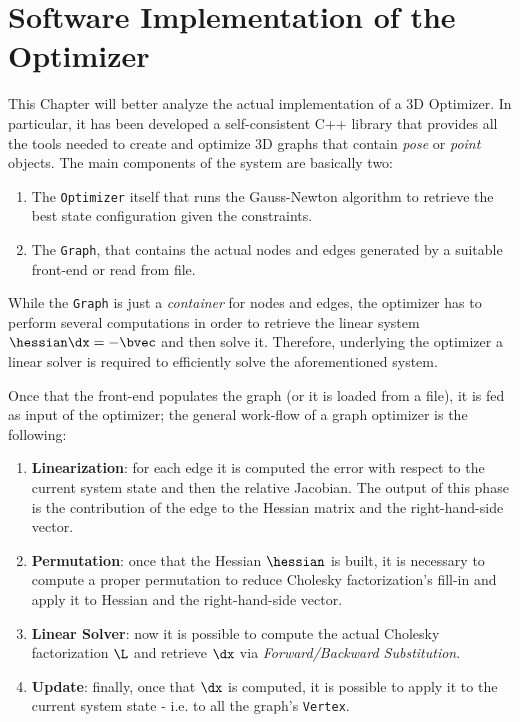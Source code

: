 \chapter{Software Implementation of the Optimizer}\label{ch:implementation}
This Chapter will better analyze the actual implementation of a 3D Optimizer. In particular, it has been developed a self-consistent C++ library that provides all the tools needed to create and optimize 3D graphs that contain \textit{pose} or \textit{point} objects. The main components of the system are basically two:

\begin{enumerate}
    \item The \texttt{Optimizer} itself that runs the Gauss-Newton algorithm to retrieve the best state configuration given the constraints.
    \item The \texttt{Graph}, that contains the actual nodes and edges generated by a suitable front-end or read from file.
\end{enumerate}

While the \texttt{Graph} is just a \textit{container} for nodes and edges, the optimizer has to perform several computations in order to retrieve the linear system $\hessian \dx = -\bvec$ and then solve it. Therefore, underlying the optimizer a linear solver is required to efficiently solve the aforementioned system. 

Once that the front-end populates the graph (or it is loaded from a file), it is fed as input of the optimizer; the general work-flow of a graph optimizer is the following:

\begin{enumerate}
    \item \textbf{Linearization}: for each edge it is computed the error with respect to the current system state and then the relative Jacobian. The output of this phase is the contribution of the edge to the Hessian matrix and the right-hand-side vector.
    \item \textbf{Permutation}: once that the Hessian $\hessian$ is built, it is necessary to compute a proper permutation to reduce Cholesky factorization's fill-in and apply it to Hessian and the right-hand-side vector.
    \item \textbf{Linear Solver}: now it is possible to compute the actual Cholesky factorization $\L$ and retrieve $\dx$ via \textit{Forward/Backward Substitution}.
    \item \textbf{Update}: finally, once that $\dx$ is computed, it is possible to apply it to the current system state -  i.e. to all the graph's \texttt{Vertex}.
\end{enumerate}

